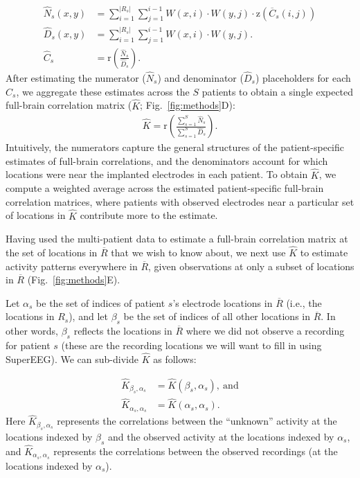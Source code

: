 \documentclass[11pt]{article}
\begin{document}
\begin{align}
\hat{N}_{s}(x,y) & = { \sum_{i = 1}^{| R_{s}|}\sum_{j=1}^{i-1} W(x,i) \cdot W(y,j)\cdot \mathrm{z}(\overline{C}_{s}(i,j))}\label{eqn:subj_corrmat_num}\\
 \hat{D}_{s}(x,y) & = \sum_{i = 1}^{| R_{s}|}\sum_{j=1}^{i-1} W(x,i)
                    \cdot W(y,j). \label{eqn:subj_corrmat_den}\\
 \hat{C}_s &= \mathrm{r}\left( \frac{\hat{N}_{s}}{\hat{D}_{s}} \right)
             \label{eqn:subj_corrmat}.
\end{align}
After estimating the numerator ($\hat{N}_{s}$) and denominator
($\hat{D}_{s}$) placeholders for each $\hat{C}_{s}$, we aggregate these
estimates across the $S$ patients to obtain a single expected full-brain
correlation matrix ($\hat{K}$; Fig.~\ref{fig:methods}D):
\begin{align}
 \hat{K} = \mathrm{r} \left(  \frac{\sum_{s=1}^S  \hat{N}_{s}}{\sum_{s=1}^S \hat{D}_{s}}\right).\label{eqn:corrmat}
\end{align}
Intuitively, the numerators capture the general structures of the
patient-specific estimates of full-brain correlations, and the
denominators account for which locations were near the implanted
electrodes in each patient.  To obtain $\hat{K}$, we compute a
weighted average across the estimated patient-specific full-brain
correlation matrices, where patients with observed electrodes near a
particular set of locations in $\hat{K}$ contribute more to the
estimate.

Having used the multi-patient data to estimate a full-brain correlation matrix
at the set of locations in $\overline{R}$ that we wish to know about, we next use
$\hat{K}$ to estimate activity patterns everywhere in $\overline{R}$, given
observations at only a subset of locations in $\overline{R}$
(Fig.~\ref{fig:methods}E).

Let $\alpha_s$ be the set of indices of patient $s$'s electrode locations in
$\overline{R}$ (i.e., the locations in $R_s$), and let $\beta_s$ be the set of
indices of all other locations in $\overline{R}$. In other words, $\beta_s$ reflects
the locations in $\overline{R}$ where we did not observe a recording for patient $s$
(these are the recording locations we will want to fill in using SuperEEG). We
can sub-divide $\hat{K}$ as follows:

\begin{align}
\hat{K}_{\beta_s,\alpha_s} &= \hat{K}(\beta_s,\alpha_s),~\mathrm{and}\label{eqn:Kba}\\
\hat{K}_{\alpha_s,\alpha_s} &= \hat{K}(\alpha_s,\alpha_s)\label{eqn:Kaa}.
\end{align}
Here $\hat{K}_{\beta_s, \alpha_s}$ represents the correlations between
the ``unknown'' activity at the locations indexed by $\beta_s$ and the
observed activity at the locations indexed by $\alpha_s$, and
$\hat{K}_{\alpha_s, \alpha_s}$ represents the correlations between the
observed recordings (at the locations indexed by $\alpha_s$).
\end{document}
